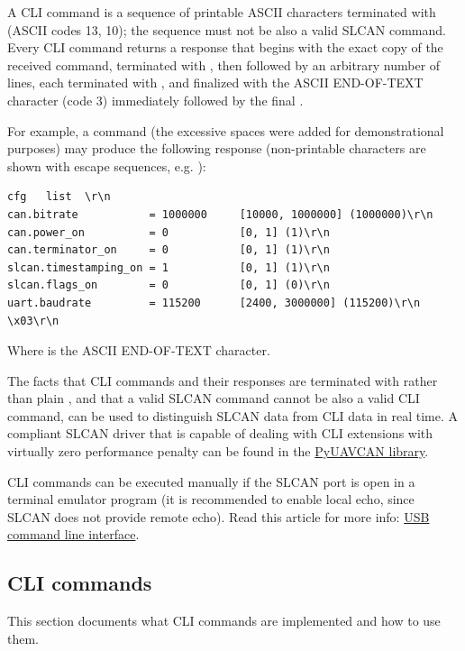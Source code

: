 \documentclass{zubaxdoc}
\begin{document}
A CLI command is a sequence of printable ASCII characters terminated with  (ASCII codes 13, 10); the sequence must not be also a valid SLCAN command. Every CLI command returns a response that begins with the exact copy of the received command, terminated with , then followed by an arbitrary number of lines, each terminated with , and finalized with the ASCII END-OF-TEXT character (code 3) immediately followed by the final .

For example, a command  (the excessive spaces were added for demonstrational purposes) may produce the following response (non-printable characters are shown with escape sequences, e.g. ):

\begin{verbatim}
cfg   list  \r\n
can.bitrate           = 1000000     [10000, 1000000] (1000000)\r\n
can.power_on          = 0           [0, 1] (1)\r\n
can.terminator_on     = 0           [0, 1] (1)\r\n
slcan.timestamping_on = 1           [0, 1] (1)\r\n
slcan.flags_on        = 0           [0, 1] (0)\r\n
uart.baudrate         = 115200      [2400, 3000000] (115200)\r\n
\x03\r\n
\end{verbatim}

Where  is the ASCII END-OF-TEXT character.

The facts that CLI commands and their responses are terminated with  rather than plain , and that a valid SLCAN command cannot be also a valid CLI command, can be used to distinguish SLCAN data from CLI data in real time. A compliant SLCAN driver that is capable of dealing with CLI extensions with virtually zero performance penalty can be found in the \href{http://uavcan.org/Implementations/Pyuavcan/}{PyUAVCAN library}.

CLI commands can be executed manually if the SLCAN port is open in a terminal emulator program (it is recommended to enable local echo, since SLCAN does not provide remote echo). Read this article for more info: \href{https://docs.zubax.com/usb}{USB command line interface}.
\clearpage

\subsection{CLI commands}

This section documents what CLI commands are implemented and how to use them.
\end{document}
